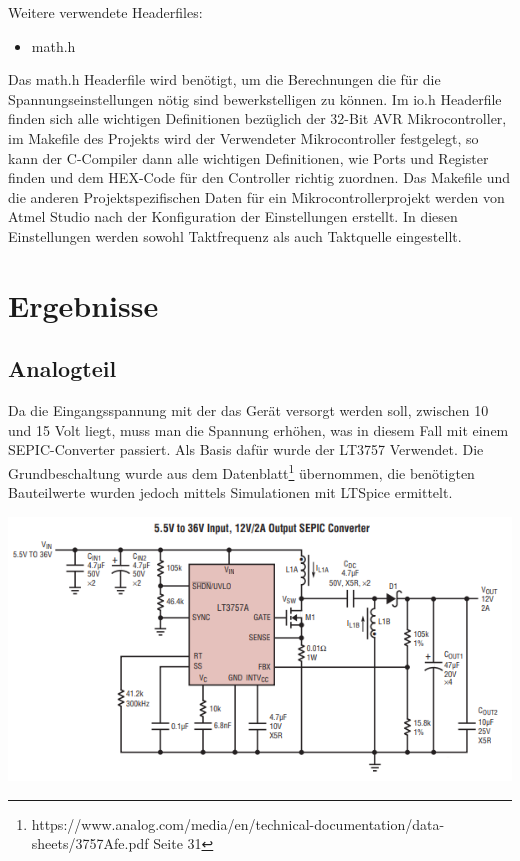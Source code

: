\documentclass[paper=a4, 12pt]{scrreprt}
\begin{document}
	Weitere verwendete Headerfiles:
	\begin{itemize}
		\item math.h
	\end{itemize}
	Das math.h Headerfile wird benötigt, um die Berechnungen die für die Spannungseinstellungen nötig sind bewerkstelligen zu können. \hfill \break
	Im io.h Headerfile finden sich alle wichtigen Definitionen bezüglich der 32-Bit AVR Mikrocontroller, im Makefile des Projekts wird der Verwendeter Mikrocontroller festgelegt, so kann der C-Compiler dann alle wichtigen Definitionen, wie Ports und Register finden und dem HEX-Code für den Controller richtig zuordnen. \hfill \break
	Das Makefile und die anderen Projektspezifischen Daten für ein Mikrocontrollerprojekt werden von Atmel Studio nach der Konfiguration der Einstellungen erstellt. In diesen Einstellungen werden sowohl Taktfrequenz als auch Taktquelle eingestellt.
	
	
\chapter{Ergebnisse}
	\section{Analogteil}
	Da die Eingangsspannung mit der das Gerät versorgt werden soll, zwischen 10 und 15 Volt liegt, muss man die Spannung erhöhen, was in diesem Fall mit einem SEPIC-Converter passiert. Als Basis dafür wurde der LT3757 Verwendet.\hfill \break
	Die Grundbeschaltung wurde aus dem Datenblatt\footnote{https://www.analog.com/media/en/technical-documentation/data-sheets/3757Afe.pdf Seite 31} übernommen, die benötigten Bauteilwerte wurden jedoch mittels Simulationen mit LTSpice ermittelt. 
	\begin{adjustbox}{center,caption={Referenzschaltung für SEPIC}, label={fig:LTSpice-Schaltung-Analogteil},nofloat=figure,vspace=\bigskipamount}
		\includegraphics[height=7cm]{img/Referenzschaltung_SEPIC.PNG}
	\end{adjustbox}
	
\end{document}
